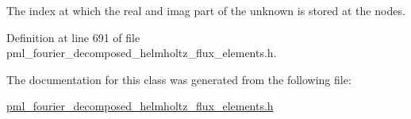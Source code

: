 The index at which the real and imag part of the unknown is stored at the nodes. 



Definition at line 691 of file pml\+\_\+fourier\+\_\+decomposed\+\_\+helmholtz\+\_\+flux\+\_\+elements.\+h.



The documentation for this class was generated from the following file\+:\begin{DoxyCompactItemize}
\item 
\hyperlink{pml__fourier__decomposed__helmholtz__flux__elements_8h}{pml\+\_\+fourier\+\_\+decomposed\+\_\+helmholtz\+\_\+flux\+\_\+elements.\+h}\end{DoxyCompactItemize}
